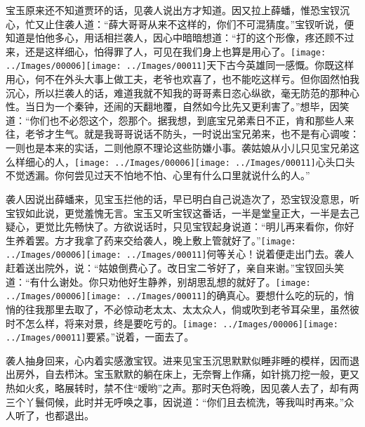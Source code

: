 宝玉原来还不知道贾环的话，见袭人说出方才知道。因又拉上薛蟠，惟恐宝钗沉心，忙又止住袭人道：``薛大哥哥从来不这样的，你们不可混猜度。''宝钗听说，便知道是怕他多心，用话相拦袭人，因心中暗暗想道：``打的这个形像，疼还顾不过来，还是这样细心，怕得罪了人，可见在我们身上也算是用心了。{\texttt{[image: ../Images/00006]}\texttt{[image: ../Images/00011]}\footnotesize \kaishu 天下古今英雄同一感慨。}你既这样用心，何不在外头大事上做工夫，老爷也欢喜了，也不能吃这样亏。但你固然怕我沉心，所以拦袭人的话，难道我就不知我的哥哥素日恣心纵欲，毫无防范的那种心性。当日为一个秦钟，还闹的天翻地覆，自然如今比先又更利害了。''想毕，因笑道：``你们也不必怨这个，怨那个。据我想，到底宝兄弟素日不正，肯和那些人来往，老爷才生气。就是我哥哥说话不防头，一时说出宝兄弟来，也不是有心调唆：一则也是本来的实话，二则他原不理论这些防嫌小事。袭姑娘从小儿只见宝兄弟这么样细心的人，{\texttt{[image: ../Images/00006]}\texttt{[image: ../Images/00011]}\footnotesize \kaishu 心头口头不觉透漏。}你何尝见过天不怕地不怕、心里有什么口里就说什么的人。''

袭人因说出薛蟠来，见宝玉拦他的话，早已明白自己说造次了，恐宝钗没意思，听宝钗如此说，更觉羞愧无言。宝玉又听宝钗这番话，一半是堂皇正大，一半是去己疑心，更觉比先畅快了。方欲说话时，只见宝钗起身说道：``明儿再来看你，你好生养着罢。方才我拿了药来交给袭人，晚上敷上管就好了。''{\texttt{[image: ../Images/00006]}\texttt{[image: ../Images/00011]}\footnotesize \kaishu 何等关心！}说着便走出门去。袭人赶着送出院外，说：``姑娘倒费心了。改日宝二爷好了，亲自来谢。''宝钗回头笑道：``有什么谢处。你只劝他好生静养，别胡思乱想的就好了。{\texttt{[image: ../Images/00006]}\texttt{[image: ../Images/00011]}\footnotesize \kaishu 的确真心。}要想什么吃的玩的，悄悄的往我那里去取了，不必惊动老太太、太太众人，倘或吹到老爷耳朵里，虽然彼时不怎么样，将来对景，终是要吃亏的。{\texttt{[image: ../Images/00006]}\texttt{[image: ../Images/00011]}\footnotesize \kaishu 要紧。}''说着，一面去了。

袭人抽身回来，心内着实感激宝钗。进来见宝玉沉思默默似睡非睡的模样，因而退出房外，自去栉沐。宝玉默默的躺在床上，无奈臀上作痛，如针挑刀挖一般，更又热如火炙，略展转时，禁不住``嗳哟''之声。那时天色将晚，因见袭人去了，却有两三个丫鬟伺候，此时并无呼唤之事，因说道：``你们且去梳洗，等我叫时再来。''众人听了，也都退出。

